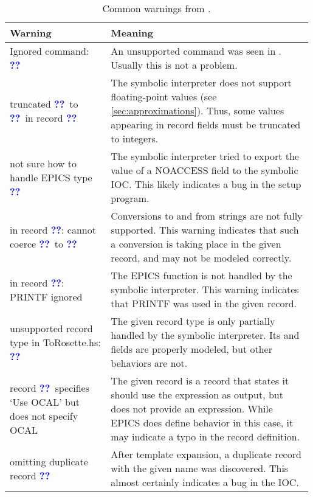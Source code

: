 \documentclass[10pt]{article}
\def\<#1>{\codeid{#1}}
\newcommand{\codeid}[1]{\ifmmode{\mbox{\smaller\ttfamily{#1}}}\else{\smaller\ttfamily{#1}}\fi}
\begin{document}
\begin{table}
  \newcommand{\hole}{\textcolor{blue}{\textbf{??}}}
  \begin{center}
  \begin{tabular}{p{0.33\linewidth}|p{0.66\linewidth}}
    \textbf{Warning} & \textbf{Meaning} \\
    \hline
    Ignored command: \hole{}\ &
      An unsupported command was seen in \<st.cmd>. Usually this is not a
      problem. \\
    truncated \hole{}\ to \hole{}\ in record \hole{}\ &
      The symbolic interpreter does not support floating-point values
      (see \autoref{sec:approximations}). Thus, some values appearing in record
      fields must be truncated to integers. \\
    not sure how to handle EPICS type \hole{}\ &
      The symbolic interpreter tried to export the value of a NOACCESS field to
      the symbolic IOC. This likely indicates a bug in the setup program. \\
    in record \hole{}: cannot coerce \hole{}\ to \hole{}\ &
      Conversions to and from strings are not fully supported. This warning
      indicates that such a conversion is taking place in the given record, and
      may not be modeled correctly. \\
    in record \hole{}: PRINTF ignored &
      The EPICS \<PRINTF> function is not handled by the symbolic interpreter.
      This warning indicates that PRINTF was used in the given record. \\
    unsupported record type in ToRosette.hs: \hole{}\ &
      The given record type is only partially handled by the symbolic interpreter.
      Its \<PACT> and \<FLNK> fields are properly modeled, but other behaviors are
      not. \\
    record \hole{}\ specifies `Use OCAL' but does not specify OCAL &
      The given record is a \<calcout> record that states it should use the
      \<OCAL> expression as output, but does not provide an \<OCAL> expression.
      While EPICS does define behavior in this case, it may indicate a typo in
      the record definition. \\
    omitting duplicate record \hole{}\ &
      After template expansion, a duplicate record with the given name was
      discovered. This almost certainly indicates a bug in the IOC. \\
  \end{tabular}
  \end{center}
  \caption{Common warnings from \<setup-symbolic>.}
  \label{tbl:setup-warnings}
\end{table}
\end{document}
